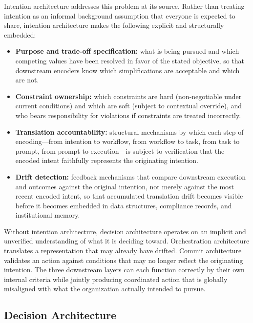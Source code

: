 \documentclass[12pt]{article}
\begin{document}
Intention architecture addresses this problem at its source. Rather than
treating intention as an informal background assumption that everyone is
expected to share, intention architecture makes the following explicit and
structurally embedded:

\begin{itemize}
  \item \textbf{Purpose and trade-off specification:} what is being pursued
    and which competing values have been resolved in favor of the stated
    objective, so that downstream encoders know which simplifications are
    acceptable and which are not.
  \item \textbf{Constraint ownership:} which constraints are hard
    (non-negotiable under current conditions) and which are soft (subject to
    contextual override), and who bears responsibility for violations if
    constraints are treated incorrectly.
  \item \textbf{Translation accountability:} structural mechanisms by which
    each step of encoding---from intention to workflow, from workflow to task,
    from task to prompt, from prompt to execution---is subject to verification
    that the encoded intent faithfully represents the originating intention.
  \item \textbf{Drift detection:} feedback mechanisms that compare downstream
    execution and outcomes against the original intention, not merely against
    the most recent encoded intent, so that accumulated translation drift
    becomes visible before it becomes embedded in data structures, compliance
    records, and institutional memory.
\end{itemize}

Without intention architecture, decision architecture operates on an implicit
and unverified understanding of what it is deciding toward. Orchestration
architecture translates a representation that may already have drifted.
Commit architecture validates an action against conditions that may no longer
reflect the originating intention. The three downstream layers can each
function correctly by their own internal criteria while jointly producing
coordinated action that is globally misaligned with what the organization
actually intended to pursue.

\subsection{Decision Architecture}
\label{sec:decision_architecture}
\end{document}
